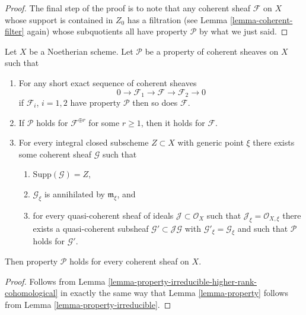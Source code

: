 \begin{proof}
\medskip\noindent
The final step of the proof is to note that any coherent sheaf
$\mathcal{F}$ on $X$ whose support is contained in $Z_0$ has a filtration
(see Lemma \ref{lemma-coherent-filter} again) whose subquotients
all have property $\mathcal{P}$ by what we just said.
\end{proof}

\begin{lemma}
\label{lemma-property-higher-rank-cohomological}
Let $X$ be a Noetherian scheme.
Let $\mathcal{P}$ be a property of coherent sheaves on $X$ such that
\begin{enumerate}
\item For any short exact sequence of coherent sheaves
$$
0 \to \mathcal{F}_1 \to \mathcal{F} \to \mathcal{F}_2 \to 0
$$
if $\mathcal{F}_i$, $i = 1, 2$ have property $\mathcal{P}$
then so does $\mathcal{F}$.
\item If $\mathcal{P}$ holds  for $\mathcal{F}^{\oplus r}$ for
some $r \geq 1$, then it holds for $\mathcal{F}$.
\item For every integral closed subscheme $Z \subset X$
with generic point $\xi$ there exists
some coherent sheaf $\mathcal{G}$ such that
\begin{enumerate}
\item $\text{Supp}(\mathcal{G}) = Z$,
\item $\mathcal{G}_\xi$ is annihilated by $\mathfrak m_\xi$, and
\item for every quasi-coherent sheaf of ideals
$\mathcal{J} \subset \mathcal{O}_X$ such that
$\mathcal{J}_\xi = \mathcal{O}_{X, \xi}$ there exists a quasi-coherent
subsheaf $\mathcal{G}' \subset \mathcal{J}\mathcal{G}$ with
$\mathcal{G}'_\xi = \mathcal{G}_\xi$ and such that
$\mathcal{P}$ holds for $\mathcal{G}'$.
\end{enumerate}
\end{enumerate}
Then property $\mathcal{P}$ holds for every coherent sheaf
on $X$.
\end{lemma}

\begin{proof}
Follows from Lemma \ref{lemma-property-irreducible-higher-rank-cohomological}
in exactly the same way that Lemma \ref{lemma-property} follows from
Lemma \ref{lemma-property-irreducible}.
\end{proof}









